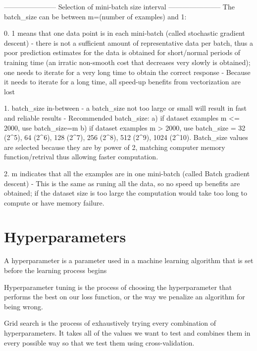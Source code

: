 \documentclass[11pt, onecolumn]{article}
\begin{document}
-----------------------
Selection of mini-batch size interval
-----------------------
The batch_size can be between m=(number of examples) and 1:

0. 1 means that one data point is in each mini-batch (called stochastic gradient descent)
	- there is not a sufficient amount of representative data per batch, thus a poor prediction estimates for the data is obtained for short/normal periods of training time (an irratic non-smooth cost that decreases very slowly is obtained); one needs to iterate for a very long time to obtain the correct response 
	- Because it needs to iterate for a long time, all speed-up benefits from vectorization are lost

1. batch_size in-between
	- a batch_size not too large or small will result in fast and reliable results
	- Recommended batch_size: 
		a) if dataset examples m <= 2000, use batch_size=m
		b) if dataset examples m > 2000, use batch_size = 32 (2^{5}), 64 (2^{6}), 128 (2^{7}), 256 (2^{8}), 512 (2^{9}), 1024 (2^{10}). Batch_size values are selected because they are by power of 2, matching computer memory function/retrival thus allowing faster computation.   
		
2. m indicates that all the examples are in one mini-batch (called Batch gradient descent)
	- This is the same as runing all the data, so no speed up benefits are obtained; if the dataset size is too large the computation would take too long to compute or have memory failure.
    









    
    
\section{Hyperparameters}
A hyperparameter is a parameter used in a machine learning algorithm that is set before the learning process begins


Hyperparameter tuning is the process of choosing the hyperparameter that performs the best on our loss function, or the way we penalize an algorithm for being wrong.
 
Grid search is the process of exhaustively trying every combination of hyperparameters. It takes all of the values we want to test and combines them in every possible way so that we test them using cross-validation.
 
\end{document}
